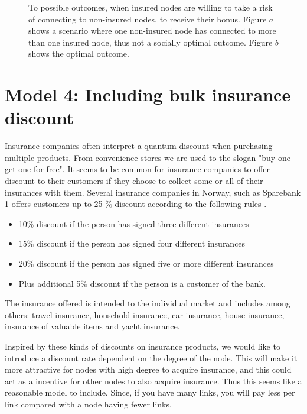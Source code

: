 \begin{figure}[t]
  \caption{\label{fig:bonusviolating} To possible outcomes, when insured nodes are willing to take a risk of connecting to non-insured nodes, to receive their bonus. Figure $a$ shows a scenario where one non-insured node has connected to more than one insured node, thus not a socially optimal outcome. Figure $b$ shows the optimal outcome. }
\end{figure}


\section{Model 4: Including bulk insurance discount}

Insurance companies often interpret a quantum discount when purchasing multiple products. From convenience stores we are used to the slogan "buy one get one for free". It seems to be common for insurance companies to offer discount to their customers if they choose to collect some or all of their insurances with them. Several insurance companies in Norway, such as Sparebank 1 offers customers up to 25 $\%$ discount according to the following rules \cite{sparebank1}. 

\begin{itemize}

\item 10$\%$ discount if the person has signed three different insurances
\item 15$\%$ discount if the person has signed four different insurances
\item 20$\%$ discount if the person has signed five or more different insurances
\item Plus additional 5$\%$ discount if the person is a customer of the bank. 

\end{itemize}

The insurance offered is intended to the individual market and includes among others: travel insurance, household insurance, car insurance, house insurance, insurance of valuable items and yacht insurance.

Inspired by these kinds of discounts on insurance products, we would like to introduce a discount rate dependent on the degree of the node. This will make it more attractive for nodes with high degree to acquire insurance, and this could act as a incentive for other nodes to also acquire insurance. Thus this seems like a reasonable model to include. Since, if you have many links, you will pay less per link compared with a node having fewer links.

